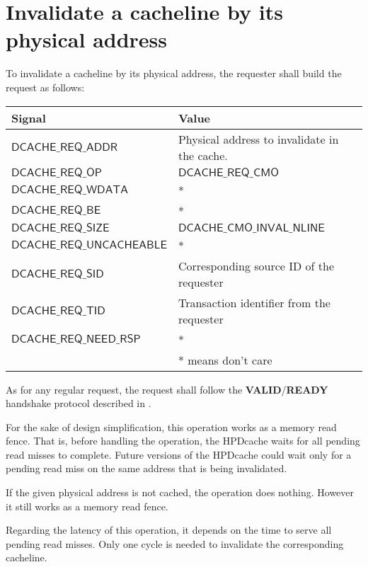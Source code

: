 \documentclass[10pt,titlepage,twoside]{book}
\begin{document}
\newpage
\section{Invalidate a cacheline by its physical address}

To invalidate a cacheline by its physical address, the requester shall build the request as follows:

{\centering\footnotesize\begin{tabular}{p{.38\linewidth}p{.55\linewidth}}
  \toprule
  \textbf{Signal}
  & \textbf{Value} \\
  \midrule
  $\mathsf{DCACHE\_REQ\_ADDR}$
  & Physical address to invalidate in the cache.\\
  \midrule
  $\mathsf{DCACHE\_REQ\_OP}$
  & $\mathsf{DCACHE\_REQ\_CMO}$ \\
  \midrule
  $\mathsf{DCACHE\_REQ\_WDATA}$
  & *\\
  \midrule
  $\mathsf{DCACHE\_REQ\_BE}$
  & *\\
  \midrule
  $\mathsf{DCACHE\_REQ\_SIZE}$
  & $\mathsf{DCACHE\_CMO\_INVAL\_NLINE}$ \\
  \midrule
  $\mathsf{DCACHE\_REQ\_UNCACHEABLE}$
  & *\\
  \midrule
  $\mathsf{DCACHE\_REQ\_SID}$
  & Corresponding source ID of the requester\\
  \midrule
  $\mathsf{DCACHE\_REQ\_TID}$
  & Transaction identifier from the requester\\
  \midrule
  $\mathsf{DCACHE\_REQ\_NEED\_RSP}$
  & *\\
  \bottomrule
  & * means don't care \\
\end{tabular}}

As for any regular request, the request shall follow the \textbf{VALID}/\textbf{READY} handshake protocol described in .

For the sake of design simplification, this operation works as a memory read fence.
That is, before handling the operation, the \ac{HPDcache} waits for all pending read misses to complete.
Future versions of the HPDcache could wait only for a pending read miss on the same address that is being invalidated.

If the given physical address is not cached, the operation does nothing.
However it still works as a memory read fence.

Regarding the latency of this operation, it depends on the time to serve all pending read misses.
Only one cycle is needed to invalidate the corresponding cacheline.
\end{document}
